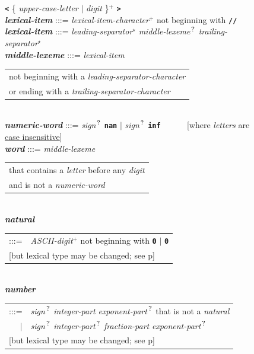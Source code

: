 \documentclass[12pt]{article}
\newcommand{\TT}[1]{{\tt \bfseries #1}}
\newcommand{\STAR}{{\Large $^\star$}}
\newcommand{\PLUS}[1][]{{$^{+#1}$}}
\newcommand{\QMARK}{{$^{\,\mbox{\footnotesize ?}}$}}
\newcommand{\ttkey}[1]{{\tt \bfseries #1}}
\newcommand{\emkey}[1]{{\em \bfseries #1}}
\newcommand{\pagref}[1]{p\pageref{#1}}
\newlength{\figurewidth}
\newenvironment{boxedfigure}[1][!btp]%
	{\begin{figure}[#1]
	 \begin{lrbox}{\figurebox}
	 \begin{minipage}{\figurewidth}

	 \vspace*{1ex}}%
	{
	 \vspace*{1ex}

	 \end{minipage}
	 \end{lrbox}

	 \centering
	 \fbox{\hspace*{0.1in}\usebox{\figurebox}\hspace*{0.1in}}
	 \end{figure}}
\begin{document}
\begin{boxedfigure}[!p]
    \TT{<} \{ {\em upper-case-letter} $|$ {\em digit} \}\PLUS{} \TT{>}
\\[1ex]
\emkey{lexical-item} :::= {\em lexical-item-character}\PLUS{}
                       not beginning with \TT{//}
\\[0.5ex]
\emkey{lexical-item} :::= {\em leading-separator}\STAR{}
			  {\em middle-lexeme}\QMARK{}
                          {\em trailing-separator}\STAR{}
\\[0.5ex]
\emkey{middle-lexeme} :::=
	{\em lexical-item}
	\begin{tabular}[t]{@{}l@{}}
	not beginning with a {\em leading-separator-character} \\
	or ending with a {\em trailing-separator-character} \\
	\end{tabular}
\\[0.5ex]
\emkey{numeric-word} :::= {\em sign}\QMARK{} \ttkey{nan}
                      $|$ {\em sign}\QMARK{} \ttkey{inf}
		      ~~~~~
		      [where {\em letters} are \underline{case insensitive}]
\\[0.5ex]
\emkey{word} :::= {\em middle-lexeme}
                  \begin{tabular}[t]{@{}l@{}}
		  that contains a {\em letter} before any {\em digit} \\
		  and is not a {\em numeric-word}
		  \end{tabular}
\\[0.5ex]
\emkey{natural}\label{NATURAL}
	\begin{tabular}[t]{@{}rl@{}}
	:::= & {\em ASCII-digit}\PLUS{} not beginning with \TT{0} $|$
	       \TT{0} \\
	\multicolumn{2}{l}{[but lexical type may be changed;
	                    see \pagref{LEXEME-TYPE-CONVERSION}]} \\
	\end{tabular}
\\[0.5ex]
\emkey{number}\label{NUMBER}
	\begin{tabular}[t]{@{}rl@{}}
	:::= & {\em sign}\QMARK{} {\em integer-part}
	                          {\em exponent-part}\QMARK{}
	     that is not a {\em natural} \\
	 $|$ & {\em sign}\QMARK{} {\em integer-part}\QMARK{}
	                          {\em fraction-part}
				  {\em exponent-part}\QMARK{} \\
	\multicolumn{2}{l}{[but lexical type may be changed;
	                    see \pagref{LEXEME-TYPE-CONVERSION}]} \\
	\end{tabular}

\end{boxedfigure}
\end{document}
